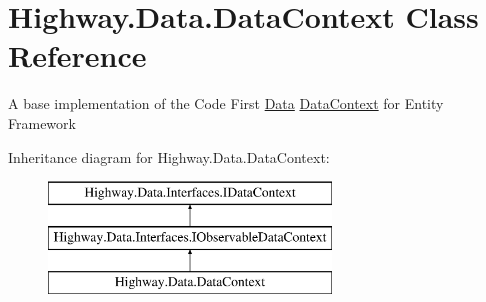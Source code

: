 \hypertarget{class_highway_1_1_data_1_1_data_context}{\section{Highway.\-Data.\-Data\-Context Class Reference}
\label{class_highway_1_1_data_1_1_data_context}
}


A base implementation of the Code First \hyperlink{namespace_highway_1_1_data}{Data} \hyperlink{class_highway_1_1_data_1_1_data_context}{Data\-Context} for Entity Framework  


Inheritance diagram for Highway.\-Data.\-Data\-Context\-:\begin{figure}[H]
\begin{center}
\leavevmode
\includegraphics[height=3.000000cm]{class_highway_1_1_data_1_1_data_context}
\end{center}
\end{figure}
